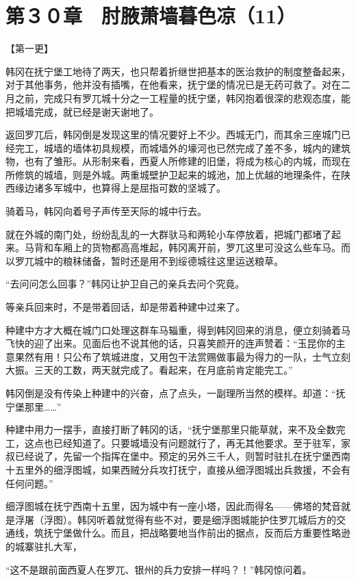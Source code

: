 \section{第３０章　肘腋萧墙暮色凉（11）}

【第一更】

韩冈在抚宁堡工地待了两天，也只帮着折继世把基本的医治救护的制度整备起来，对于其他事务，他并没有插嘴，在他看来，抚宁堡的情况已是无药可救了。对在二月之前，完成只有罗兀城十分之一工程量的抚宁堡，韩冈抱着很深的悲观态度，能把城墙完成，就已经是谢天谢地了。

返回罗兀后，韩冈倒是发现这里的情况要好上不少。西城无门，而其余三座城门已经完工，城墙的墙体初具规模，而城墙外的壕河也已然完成了差不多，城内的建筑物，也有了雏形。从形制来看，西夏人所修建的旧堡，将成为核心的内城，而现在所修筑的城墙，则是外城。两重城壁护卫起来的城池，加上优越的地理条件，在陕西缘边诸多军城中，也算得上是屈指可数的坚城了。

骑着马，韩冈向着号子声传至天际的城中行去。

就在外城的南门处，纷纷乱乱的一大群驮马和两轮小车停放着，把城门都堵了起来。马背和车厢上的货物都高高堆起，韩冈离开前，罗兀这里可没这么些车马。而以罗兀城中的粮秣储备，暂时还是用不到绥德城往这里运送粮草。

“去问问怎么回事？”韩冈让护卫自己的亲兵去问个究竟。

等亲兵回来时，不是带着回话，却是带着种建中过来了。

种建中方才大概在城门口处理这群车马辎重，得到韩冈回来的消息，便立刻骑着马飞快的迎了出来。见面后也不说其他的话，只喜笑颜开的连声赞着：“玉昆你的主意果然有用！只公布了筑城进度，又用包干法赏赐做事最为得力的一队，士气立刻大振。三天的工数，两天就完成了。看起来，在月底前肯定能完工。”

韩冈倒是没有传染上种建中的兴奋，点了点头，一副理所当然的模样。却道：“抚宁堡那里……”

种建中用力一摆手，直接打断了韩冈的话，“抚宁堡那里只能草就，来不及全数完工，这点也已经知道了。只要城墙没有问题就行了，再无其他要求。至于驻军，家叔已经说了，先留一个指挥在堡中。预定的另外三千人，则暂时驻扎在抚宁堡西南十五里外的细浮图城，如果西贼分兵攻打抚宁，直接从细浮图城出兵救援，不会有任何问题。”

细浮图城在抚宁西南十五里，因为城中有一座小塔，因此而得名——佛塔的梵音就是浮屠（浮图）。韩冈听着就觉得有些不对，要是细浮图城能护住罗兀城后方的交通线，筑抚宁堡做什么。而且，把战略要地当作前出的据点，反而后方重要性略逊的城寨驻扎大军，

“这不是跟前面西夏人在罗兀、银州的兵力安排一样吗？！”韩冈惊问着。

